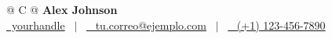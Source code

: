 

\begin{tabularx}{\linewidth}{@{} C @{}}
{\fontsize{32}{38}\selectfont\color{primary}\textbf{Alex Johnson}} \\[10pt]
\href{https://github.com/yourhandle}{\raisebox{-0.05\height}{\Large\faGithub}\ yourhandle} \ {\color{primary}$|$} \ 
\href{mailto:tu.correo@ejemplo.com}{\raisebox{-0.05\height}{\Large\faEnvelope} \ tu.correo@ejemplo.com} \ {\color{primary}$|$} \ 
\href{tel:+11234567890}{\raisebox{-0.05\height}{\Large\faMobile} \ (+1) 123-456-7890} \\[3pt]
\end{tabularx}
